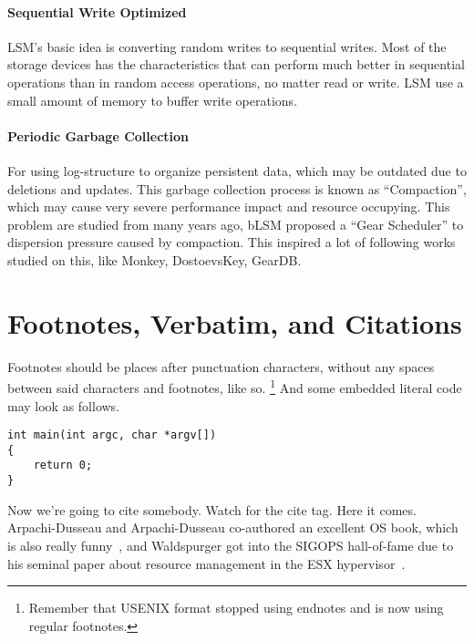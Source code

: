 \paragraph{Sequential Write Optimized} LSM's basic idea is converting random writes to sequential writes. Most of the storage devices has the characteristics that can perform much better in sequential operations than in random access operations, no matter read or write. LSM use a small amount of memory to buffer write operations.

\paragraph{Periodic Garbage Collection} For using log-structure to organize persistent data, which may be outdated due to deletions and updates. This garbage collection process is known as ``Compaction'', which may cause very severe performance impact and resource occupying. This problem are studied from many years ago, bLSM\cite{sears2012blsm} proposed a ``Gear Scheduler'' to dispersion pressure caused by compaction. This inspired a lot of following works studied on this, like Monkey\cite{dayan2017monkey}, DostoevsKey\cite{dayan2018dostoevsky}, GearDB\cite{yao2019geardb}. 

\subsubsection{}
\section{Footnotes, Verbatim, and Citations}

Footnotes should be places after punctuation characters, without any
spaces between said characters and footnotes, like so.%
\footnote{Remember that USENIX format stopped using endnotes and is
  now using regular footnotes.} And some embedded literal code may
look as follows.

\begin{verbatim}
int main(int argc, char *argv[]) 
{
    return 0;
}
\end{verbatim}

Now we're going to cite somebody. Watch for the cite tag. Here it
comes. Arpachi-Dusseau and Arpachi-Dusseau co-authored an excellent OS
book, which is also really funny~\cite{arpachiDusseau18:osbook}, and
Waldspurger got into the SIGOPS hall-of-fame due to his seminal paper
about resource management in the ESX hypervisor~\cite{waldspurger02}.

